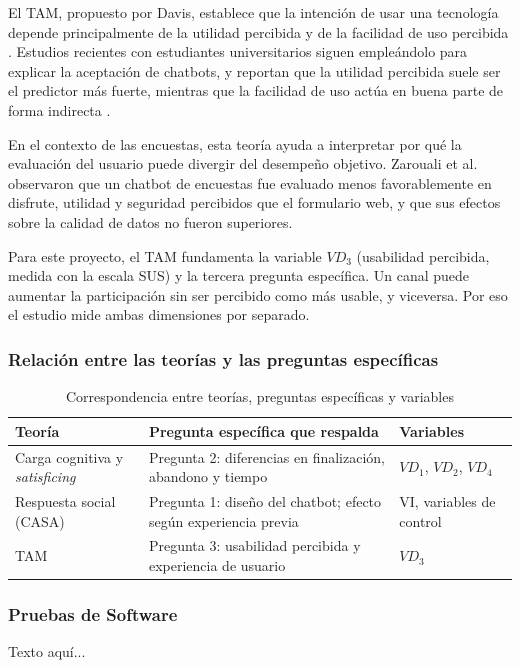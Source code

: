 \documentclass[12pt,letterpaper]{article}
\begin{document}
El TAM, propuesto por Davis, establece que la intención de usar una tecnología depende principalmente de la utilidad percibida y de la facilidad de uso percibida \cite{davis1989}. Estudios recientes con estudiantes universitarios siguen empleándolo para explicar la aceptación de chatbots, y reportan que la utilidad percibida suele ser el predictor más fuerte, mientras que la facilidad de uso actúa en buena parte de forma indirecta \cite{tam2026}.

En el contexto de las encuestas, esta teoría ayuda a interpretar por qué la evaluación del usuario puede divergir del desempeño objetivo. Zarouali et al. \cite{zarouali2023} observaron que un chatbot de encuestas fue evaluado menos favorablemente en disfrute, utilidad y seguridad percibidos que el formulario web, y que sus efectos sobre la calidad de datos no fueron superiores.

Para este proyecto, el TAM fundamenta la variable $VD_3$ (usabilidad percibida, medida con la escala SUS) y la tercera pregunta específica. Un canal puede aumentar la participación sin ser percibido como más usable, y viceversa. Por eso el estudio mide ambas dimensiones por separado.

\subsubsection{Relación entre las teorías y las preguntas específicas}

\begin{table}[htbp]
\centering
\caption{Correspondencia entre teorías, preguntas específicas y variables}
\small
\begin{tabular}{|p{4cm}|p{4.5cm}|p{3.5cm}|}
\hline
\textbf{Teoría} & \textbf{Pregunta específica que respalda} & \textbf{Variables} \\ \hline
Carga cognitiva y \textit{satisficing} & Pregunta 2: diferencias en finalización, abandono y tiempo & $VD_1$, $VD_2$, $VD_4$ \\ \hline
Respuesta social (CASA) & Pregunta 1: diseño del chatbot; efecto según experiencia previa & VI, variables de control \\ \hline
TAM & Pregunta 3: usabilidad percibida y experiencia de usuario & $VD_3$ \\ \hline
\end{tabular}
\end{table}

\subsubsection{Pruebas de Software}
Texto aquí...
\end{document}
